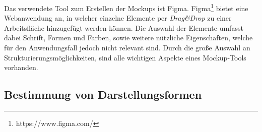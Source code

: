 Das verwendete Tool zum Erstellen der Mockups ist Figma.
Figma\footnote{https://www.figma.com/} bietet eine Webanwendung an, in welcher einzelne Elemente per \emph{Drag\&Drop} zu einer Arbeitsfläche hinzugefügt werden können.
Die Auswahl der Elemente umfasst dabei Schrift, Formen und Farben, sowie weitere nützliche Eigenschaften, welche für den Anwendungsfall jedoch nicht relevant sind.
Durch die große Auswahl an Strukturierungsmöglichkeiten, sind alle wichtigen Aspekte eines Mockup-Tools vorhanden.


\subsection{Bestimmung von Darstellungsformen}
